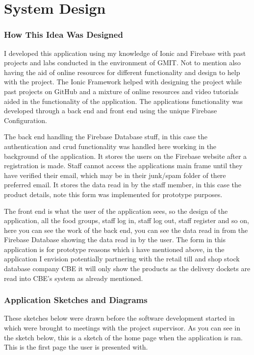 \chapter{System Design}

\subsection{How This Idea Was Designed}
I developed this application using my knowledge of Ionic and Firebase with past projects and labs conducted in the environment of GMIT. Not to mention also having the aid of online resources for different functionality and design to help with the project. The Ionic Framework helped with designing the project while past projects on GitHub and a mixture of online resources and video tutorials aided in the functionality of the application. The applications functionality was developed through a back end and front end using the unique Firebase Configuration.
\newline

The back end handling the Firebase Database stuff, in this case the authentication and crud functionality was handled here working in the background of the application. It stores the users on the Firebase website after a registration is made. Staff cannot access the applications main frame until they have verified their email, which may be in their junk/spam folder of there preferred email. It stores the data read in by the staff member, in this case the product details, note this form was implemented for prototype purposes.
\newline 

The front end is what the user of the application sees, so the design of the application, all the food groups, staff log in, staff log out, staff register and so on, here you can see the work of the back end, you can see the data read in from the Firebase Database showing the data read in by the user. The form in this application is for prototype reasons which i have mentioned above, in the application I envision potentially partnering with the retail till and shop stock database company CBE it will only show the products as the delivery dockets are read into CBE's system as already mentioned. 
\newpage
\subsection{Application Sketches and Diagrams}
These sketches below were drawn before the software development started in which were brought to meetings with the project supervisor. 
\newline
As you can see in the sketch below, this is a sketch of the home page when the application is ran. This is the first page the user is presented with.

